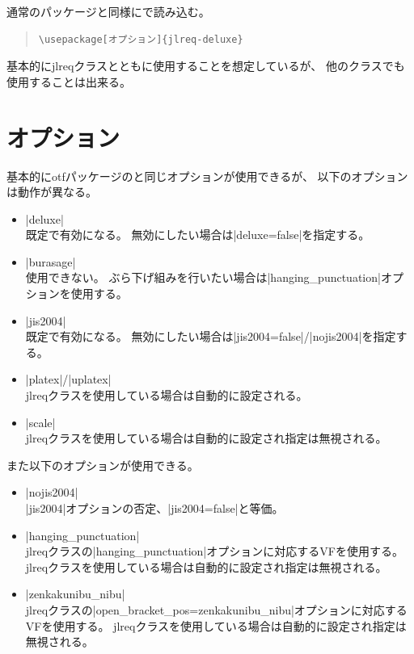 \documentclass[dvipdfmx,a4paper]{jlreq}
\newcommand{\pkg}[1]{\textsf{#1}}
\newcommand{\cls}[1]{\textsf{#1}}
\newcommand{\cmd}[1]{\eghostguarded{\texttt{\symbol{92}#1}}}
\begin{document}
通常のパッケージと同様に\cmd{usepackage}で読み込む。

\begin{quote}
\begin{verbatim}
\usepackage[オプション]{jlreq-deluxe}
\end{verbatim}
\end{quote}

基本的に\cls{jlreq}クラスとともに使用することを想定しているが、
他のクラスでも使用することは出来る。


\section{オプション}

基本的に\pkg{otf}パッケージのと同じオプションが使用できるが、
以下のオプションは動作が異なる。

\begin{itemize}
\item |deluxe|\\
  既定で有効になる。
  無効にしたい場合は|deluxe=false|を指定する。
\item |burasage|\\
  使用できない。
  ぶら下げ組みを行いたい場合は|hanging_punctuation|オプションを使用する。
\item |jis2004|\\
  既定で有効になる。
  無効にしたい場合は|jis2004=false|/|nojis2004|を指定する。
\item |platex|/|uplatex|\\
  \cls{jlreq}クラスを使用している場合は自動的に設定される。
\item |scale|\\
  \cls{jlreq}クラスを使用している場合は自動的に設定され指定は無視される。
\end{itemize}

また以下のオプションが使用できる。

\begin{itemize}
\item |nojis2004|\\
  |jis2004|オプションの否定、|jis2004=false|と等価。
\item |hanging_punctuation|\\
  \cls{jlreq}クラスの|hanging_punctuation|オプションに対応するVFを使用する。
  \cls{jlreq}クラスを使用している場合は自動的に設定され指定は無視される。
\item |zenkakunibu_nibu|\\
  \cls{jlreq}クラスの|open_bracket_pos=zenkakunibu_nibu|オプションに対応するVFを使用する。
  \cls{jlreq}クラスを使用している場合は自動的に設定され指定は無視される。
\end{itemize}
\end{document}
